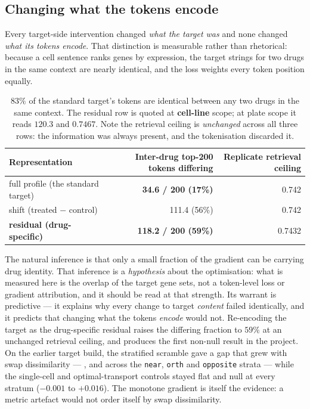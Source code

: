 \subsection{Changing what the tokens encode}
\label{sec:res-encoding}

Every target-side intervention changed \emph{what the target was} and none changed \emph{what its
tokens encode}. That distinction is measurable rather than rhetorical: because a cell sentence
ranks genes by expression, the target strings for two drugs in the same context are nearly
identical, and the loss weights every token position equally.

\begin{table}[h]
\centering
\begin{tabular}{lrr}
\toprule
Representation & Inter-drug top-200 tokens differing & Replicate retrieval ceiling \\
\midrule
full profile (the standard target) & \textbf{34.6 / 200 (17\%)} & 0.742 \\
shift (treated $-$ control) & 111.4 (56\%) & 0.742 \\
\textbf{residual (drug-specific)} & \textbf{118.2 / 200 (59\%)} & 0.7432 \\
\bottomrule
\end{tabular}
\caption{$83\%$ of the standard target's tokens are identical between any two drugs in the same
context. The residual row is quoted at \textbf{cell-line} scope; at plate scope it reads $120.3$
and $0.7467$. Note the retrieval ceiling is \emph{unchanged} across all three rows: the information
was always present, and the tokenisation discarded it.}
\label{tab:divergence}
\end{table}

The natural inference is that only a small fraction of the gradient can be carrying drug identity.
That inference is a \emph{hypothesis} about the optimisation: what is measured here is the overlap
of the target gene sets, not a token-level loss or gradient attribution, and it should be read at
that strength. Its warrant is predictive --- it explains why every change to target \emph{content}
failed identically, and it predicts that changing what the tokens \emph{encode} would not.
Re-encoding the target as the drug-specific residual raises the differing fraction to $59\%$ at an
unchanged retrieval ceiling, and produces the first non-null result in the project. On the earlier
target build, the stratified scramble gave a gap that grew with swap dissimilarity ---
,  and 
across the \texttt{near}, \texttt{orth} and \texttt{opposite} strata --- while the single-cell and
optimal-transport controls stayed flat and null at every stratum ($-0.001$ to $+0.016$). The
monotone gradient is itself the evidence: a metric artefact would not order itself by swap
dissimilarity.

